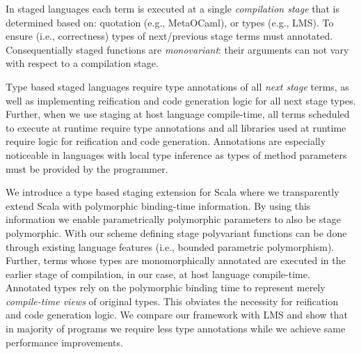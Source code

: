 In staged languages each term is executed at a single \emph{compilation stage}
 that is determined based on: quotation (e.g., MetaOCaml), or types (e.g., LMS).
 To ensure  (i.e., correctness) types of next/previous
 stage terms must annotated. Consequentially staged functions are \emph{monovariant}:
 their arguments can not vary with respect to a compilation stage.

Type based staged languages require type annotations of all \emph{next stage}
 terms, as well as implementing reification and code generation logic for all
 next stage types. Further, when we use staging at host language compile-time,
 all terms scheduled to execute at runtime require type annotations and all
 libraries used at runtime require logic for reification and code generation.
 Annotations are especially noticeable in languages with local type
 inference as types of method parameters must be provided by the programmer.

We introduce a type based staging extension for Scala where we transparently
 extend Scala with polymorphic binding-time information. By using this information
 we enable parametrically polymorphic parameters to also be stage polymorphic.
 With our scheme defining stage polyvariant functions can be done through
 existing language features (i.e., bounded parametric polymorphism).  Further,
 terms whose types are monomorphically annotated are executed in the earlier
 stage of compilation, in our case, at host language compile-time. Annotated
 types rely on the polymorphic binding time to represent merely \emph{\mbox
 {compile-time} views} of original types. This obviates the necessity for
 reification and code generation logic. We compare our framework with LMS and
 show that in  majority of programs we require less type annotations while we
 achieve same  performance  improvements.
